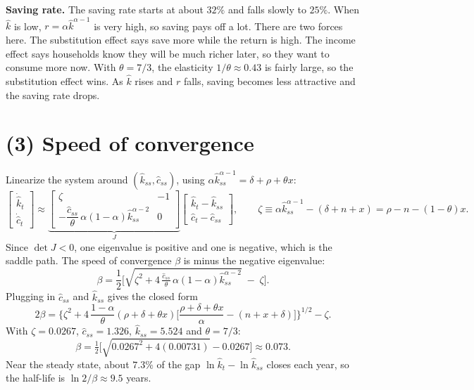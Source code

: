 \documentclass[11pt]{article}
\begin{document}
\textbf{Saving rate.} The saving rate starts at about $32\%$ and falls slowly to $25\%$. When
$\hat k$ is low, $r=\alpha\hat k^{\alpha-1}$ is very high, so saving pays off a lot. There are two forces
here. The substitution effect says save more while the return is high. The income effect says
households know they will be much richer later, so they want to consume more now. With $\theta = 7/3$,
the elasticity $1/\theta\approx0.43$ is fairly large, so the substitution effect wins. As $\hat k$ rises
and $r$ falls, saving becomes less attractive and the saving rate drops.

\section*{(3) Speed of convergence}

Linearize the system around $(\hat k_{ss},\hat c_{ss})$, using
$\alpha\hat k_{ss}^{\alpha-1}=\delta+\rho+\theta x$:
\[
\begin{bmatrix}\dot{\hat k}_t\\ \dot{\hat c}_t\end{bmatrix}
\approx
\underbrace{\begin{bmatrix}
\zeta & -1\\[2pt]
-\dfrac{\hat c_{ss}}{\theta}\,\alpha(1-\alpha)\hat k_{ss}^{\alpha-2} & 0
\end{bmatrix}}_{J}
\begin{bmatrix}\hat k_t-\hat k_{ss}\\ \hat c_t-\hat c_{ss}\end{bmatrix},
\qquad
\zeta \equiv \alpha\hat k_{ss}^{\alpha-1}-(\delta+n+x) = \rho-n-(1-\theta)x .
\]
Since $\det J<0$, one eigenvalue is positive and one is negative, which is the saddle path. The speed
of convergence $\beta$ is minus the negative eigenvalue:
\[
\beta = \frac12\Big[\sqrt{\zeta^2 + 4\,\tfrac{\hat c_{ss}}{\theta}\,\alpha(1-\alpha)\hat k_{ss}^{\alpha-2}}
          \;-\; \zeta\Big].
\]
Plugging in $\hat c_{ss}$ and $\hat k_{ss}$ gives the closed form
\[
2\beta = \bigg\{\zeta^2 + 4\,\frac{1-\alpha}{\theta}(\rho+\delta+\theta x)
         \Big[\frac{\rho+\delta+\theta x}{\alpha} - (n+x+\delta)\Big]\bigg\}^{1/2} - \zeta .
\]
With $\zeta = 0.0267$, $\hat c_{ss}=1.326$, $\hat k_{ss}=5.524$ and $\theta=7/3$:
\[
\beta = \tfrac12\big[\sqrt{0.0267^2 + 4(0.00731)} - 0.0267\big] \approx 0.073 .
\]
Near the steady state, about $7.3\%$ of the gap $\ln\hat k_t - \ln\hat k_{ss}$ closes each year, so
the half-life is $\ln 2/\beta \approx 9.5$ years.
\end{document}
